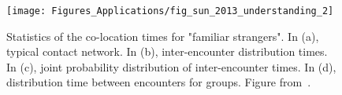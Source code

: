 \begin{figure}[t!]
\centering
\texttt{[image: Figures\_Applications/fig\_sun\_2013\_understanding\_2]}
\caption{Statistics of the co-location times for "familiar strangers". In (a), typical contact network. In (b), inter-encounter distribution times. In (c), joint probability distribution of inter-encounter times. In (d), distribution time between encounters for groups. Figure from~\cite{sun_2013_understanding}.}
\label{fig:sun_2013_understanding_2}
\end{figure}


%
%

